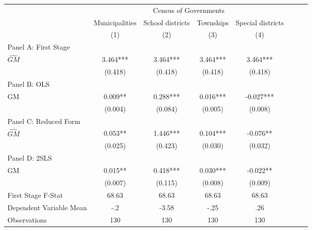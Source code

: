  \begin{tabular}{l*{7}{c}} \toprule
&\multicolumn{4}{c}{Census of Governments}\\\cmidrule(lr){2-5}
&\multicolumn{1}{c}{Municipalities}&\multicolumn{1}{c}{School districts}&\multicolumn{1}{c}{Townships}&\multicolumn{1}{c}{Special districts}\\\cmidrule(lr){2-5}
&\multicolumn{1}{c}{(1)}&\multicolumn{1}{c}{(2)}&\multicolumn{1}{c}{(3)}&\multicolumn{1}{c}{(4)}\\
\cmidrule(lr){1-5}
\multicolumn{4}{l}{Panel A: First Stage}\\
\cmidrule(lr){1-5}
$\widehat{GM}$  &    3.464***&    3.464***&    3.464***&    3.464***\\
                &  (0.418)   &  (0.418)   &  (0.418)   &  (0.418)   \\
\cmidrule(lr){1-5}
\multicolumn{4}{l}{Panel B: OLS}\\
\cmidrule(lr){1-5}
GM              &    0.009** &    0.288***&    0.016***&   -0.027***\\
                &  (0.004)   &  (0.084)   &  (0.005)   &  (0.008)   \\
\cmidrule(lr){1-5}
\multicolumn{4}{l}{Panel C: Reduced Form}\\
\cmidrule(lr){1-5}
$\widehat{GM}$  &    0.053** &    1.446***&    0.104***&   -0.076** \\
                &  (0.025)   &  (0.423)   &  (0.030)   &  (0.032)   \\
\cmidrule(lr){1-5}
\multicolumn{4}{l}{Panel D: 2SLS}\\
\cmidrule(lr){1-5}
GM              &    0.015** &    0.418***&    0.030***&   -0.022** \\
                &  (0.007)   &  (0.115)   &  (0.008)   &  (0.009)   \\
\midrule
First Stage F-Stat&    68.63   &    68.63   &    68.63   &    68.63   \\
Dependent Variable Mean&      -.2   &    -3.58   &     -.25   &      .26   \\
Observations    &      130   &      130   &      130   &      130   \\
       \bottomrule \end{tabular}
